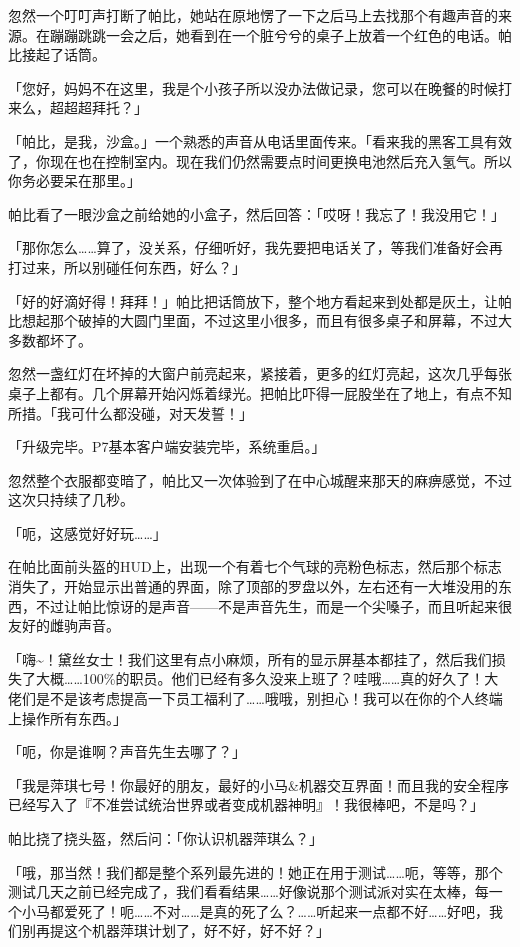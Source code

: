 忽然一个叮叮声打断了帕比，她站在原地愣了一下之后马上去找那个有趣声音的来源。在蹦蹦跳跳一会之后，她看到在一个脏兮兮的桌子上放着一个红色的电话。帕比接起了话筒。

「您好，妈妈不在这里，我是个小孩子所以没办法做记录，您可以在晚餐的时候打来么，超超超拜托？」

「帕比，是我，沙盒。」一个熟悉的声音从电话里面传来。「看来我的黑客工具有效了，你现在也在控制室内。现在我们仍然需要点时间更换电池然后充入氢气。所以你务必要呆在那里。」

帕比看了一眼沙盒之前给她的小盒子，然后回答：「哎呀！我忘了！我没用它！」

「那你怎么……算了，没关系，仔细听好，我先要把电话关了，等我们准备好会再打过来，所以别碰任何东西，好么？」

「好的好滴好得！拜拜！」帕比把话筒放下，整个地方看起来到处都是灰土，让帕比想起那个破掉的大圆门里面，不过这里小很多，而且有很多桌子和屏幕，不过大多数都坏了。

忽然一盏红灯在坏掉的大窗户前亮起来，紧接着，更多的红灯亮起，这次几乎每张桌子上都有。几个屏幕开始闪烁着绿光。把帕比吓得一屁股坐在了地上，有点不知所措。「我可什么都没碰，对天发誓！」

「{\mt 升级完毕。P7基本客户端安装完毕，系统重启。}」

忽然整个衣服都变暗了，帕比又一次体验到了在中心城醒来那天的麻痹感觉，不过这次只持续了几秒。

「呃，这感觉好好玩……」

在帕比面前头盔的HUD上，出现一个有着七个气球的亮粉色标志，然后那个标志消失了，开始显示出普通的界面，除了顶部的罗盘以外，左右还有一大堆没用的东西，不过让帕比惊讶的是声音——不是声音先生，而是一个尖嗓子，而且听起来很友好的雌驹声音。

「嗨\textasciitilde！黛丝女士！我们这里有点小麻烦，所有的显示屏基本都挂了，然后我们损失了大概……100\%的职员。他们已经有多久没来上班了？哇哦……真的好久了！大佬们是不是该考虑提高一下员工福利了……哦哦，别担心！我可以在你的个人终端上操作所有东西。」

「呃，你是谁啊？声音先生去哪了？」

「我是萍琪七号！你最好的朋友，最好的小马\&机器交互界面！而且我的安全程序已经写入了『不准尝试统治世界或者变成机器神明』！我很棒吧，不是吗？」

帕比挠了挠头盔，然后问：「你认识机器萍琪么？」

「哦，那当然！我们都是整个系列最先进的！她正在用于测试……呃，等等，那个测试几天之前已经完成了，我们看看结果……好像说那个测试派对实在太棒，每一个小马都爱死了！呃……不对……是真的死了么？……听起来一点都不好……好吧，我们别再提这个机器萍琪计划了，好不好，好不好？」

